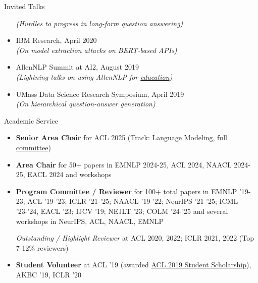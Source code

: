 \documentclass{resume} %
\begin{document}
\begin{rSection}{Invited Talks}
\begin{itemize}[leftmargin=*]
\textit{(Hurdles to progress in long-form question answering)}
\item IBM Research, April 2020\\
\textit{(On model extraction attacks on BERT-based APIs)}
\item AllenNLP Summit at AI2, August 2019 \\
\textit{(Lightning talks on using AllenNLP for \href{https://github.com/martiansideofthemoon/allennlp-probe-hw}{education})}
\item UMass Data Science Research Symposium, April 2019 \\
\textit{(On hierarchical question-answer generation)}
\end{itemize}
\end{rSection}

\begin{rSection}{Academic Service}
\vspace*{0.1in}
\begin{itemize}[leftmargin=*]

\item \textbf{Senior Area Chair} for ACL 2025 (Track: Language Modeling, \href{https://2025.aclweb.org/committees/program/}{full committee})

\item \textbf{Area Chair} for 50+ papers in EMNLP 2024-25, ACL 2024, NAACL 2024-25, EACL 2024 and workshops

\item \textbf{Program Committee / Reviewer} for 100+ total papers in EMNLP '19-23; ACL '19-'23; ICLR '21-'25; NAACL '19-'22; NeurIPS '21-'25; ICML '23-'24, EACL '23; IJCV '19; NEJLT '23; COLM '24-'25 and several workshops in NeurIPS, ACL, NAACL, EMNLP

\emph{Outstanding / Highlight Reviewer} at ACL 2020, 2022; ICLR 2021, 2022  (Top 7-12\% reviewers)

\item \textbf{Student Volunteer} at ACL '19 (awarded \href{http://www.acl2019.org/EN/student-scholarship-applications-volunteers.xhtml}{ACL 2019 Student Scholarship}), AKBC '19, ICLR '20
\end{itemize}
\end{rSection}
\end{document}
